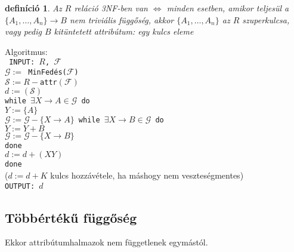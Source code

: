 \documentclass[fleqn,10pt,a4paper]{article}
\newcommand{\F}{\mathcal{F}}
\theoremstyle{magyar}
\newtheorem{de}{definíció}[section]
\begin{document}
  \begin{de}Az $R$ reláció 3NF-ben van $\iff$ minden esetben, amikor teljesül a\\ $\{A_1,\ldots,A_n\}\to B$ nem triviális függőség,
    akkor $\{A_1,\ldots,A_n\}$ az $R$ szuperkulcsa, vagy pedig $B$ kitüntetett attribútum: egy kulcs eleme
  \end{de}

  \noindent Algoritmus:\\
  \texttt{
    \hspace*{0.3cm} INPUT: $R$, $\F$\\
    \hspace*{0.3cm} $\mathcal{G}:= $ MinFedés($\F$)\\
    \hspace*{0.3cm} $\mathcal{S} := R - $attr$(\F)$\\
    \hspace*{0.3cm} $d := (\mathcal{S})$\\
    \hspace*{0.3cm} while $\exists X\to A \in \mathcal{G}$ do\\
    \hspace*{0.7cm} $Y := \{A\}$\\
    \hspace*{0.7cm} $\mathcal{G} := \mathcal{G} - \{X\to A\}$
    \hspace*{0.7cm} while $\exists X\to B\in \mathcal{G}$ do\\
    \hspace*{1.4cm} $Y := Y + B$\\
    \hspace*{1.4cm} $\mathcal{G} := \mathcal{G} - \{X\to B\}$\\
    \hspace*{0.7cm} done\\
    \hspace*{0.7cm} $d := d + (XY)$\\
    \hspace*{0.3cm} done}\\
  \hspace*{0.3cm} {\small ($d:=d+K$ kulcs hozzávétele, ha máshogy nem veszteségmentes)}\\
  \hspace*{0.3cm} \texttt{OUTPUT: $d$}
  
  

  \subsection{Többértékű függőség}
  Ekkor attribútumhalmazok nem függetlenek egymástól.
  
\end{document}
